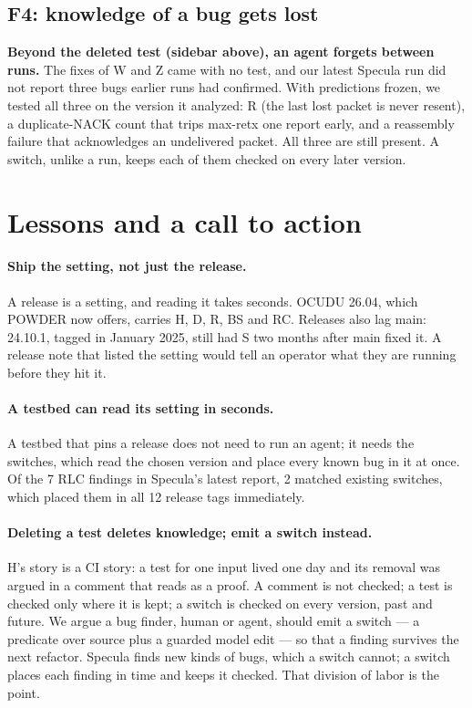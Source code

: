 \documentclass[sigconf,10pt]{acmart}
\newcommand{\sw}[1]{\textsf{\small #1}}
\begin{document}
\subsection{F4: knowledge of a bug gets lost}

\textbf{Beyond the deleted test (sidebar above), an agent forgets between
runs.} The fixes of \sw{W} and \sw{Z} came with no test, and our latest
Specula run did not report three bugs earlier runs had confirmed. With
predictions frozen, we tested all three on the version it analyzed: \sw{R}
(the last lost packet is never resent), a duplicate-NACK count that trips
max-retx one report early, and a reassembly failure that acknowledges an
undelivered packet. All three are still present. A switch, unlike a run,
keeps each of them checked on every later version.

\section{Lessons and a call to action}
\label{sec:discussion}

\paragraph{Ship the setting, not just the release.}
A release is a setting, and reading it takes seconds. OCUDU 26.04, which
POWDER now offers, carries \sw{H}, \sw{D}, \sw{R}, \sw{BS} and \sw{RC}.
Releases also lag main: 24.10.1, tagged in January 2025, still had \sw{S}
two months after main fixed it. A release note that listed the setting
would tell an operator what they are running before they hit it.

\paragraph{A testbed can read its setting in seconds.}
A testbed that pins a release does not need to run an agent; it needs the
switches, which read the chosen version and place every known bug in it
at once. Of the 7 RLC findings in Specula's latest report, 2 matched
existing switches, which placed them in all 12 release tags immediately.

\paragraph{Deleting a test deletes knowledge; emit a switch instead.}
\sw{H}'s story is a CI story: a test for one input lived one day and its
removal was argued in a comment that reads as a proof. A comment is not
checked; a test is checked only where it is kept; a switch is checked on
every version, past and future. We argue a bug finder, human or agent,
should emit a switch --- a predicate over source plus a guarded model
edit --- so that a finding survives the next refactor. Specula finds new
kinds of bugs, which a switch cannot; a switch places each finding in
time and keeps it checked. That division of labor is the point.
\end{document}
